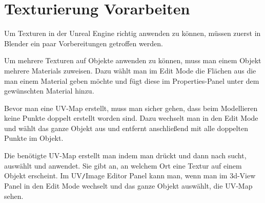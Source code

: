 \section{Texturierung Vorarbeiten}
Um Texturen in der Unreal Engine richtig anwenden zu können, müssen zuerst in Blender ein paar Vorbereitungen getroffen werden.

Um mehrere Texturen auf Objekte anwenden zu können, muss man einem Objekt mehrere Materials zuweisen. Dazu wählt man im Edit Mode die Flächen aus die man einem Material geben
möchte und fügt diese im Properties-Panel unter  dem gewünschten Material hinzu.

Bevor man eine UV-Map erstellt, muss man sicher gehen, dass beim Modellieren keine Punkte
doppelt erstellt worden sind. Dazu wechselt man in den Edit Mode und wählt das ganze Objekt aus und entfernt anschließend mit  
alle doppelten Punkte im Objekt.

Die benötigte UV-Map erstellt man indem man \keys{\SPACE} drückt und dann nach  sucht, auswählt und anwendet. Sie gibt an, an welchem Ort
eine Textur auf einem Objekt erscheint. Im UV\verb-/-Image Editor Panel kann man, wenn man im 3d-View Panel in den Edit Mode
wechselt und das ganze Objekt auswählt, die UV-Map sehen.
